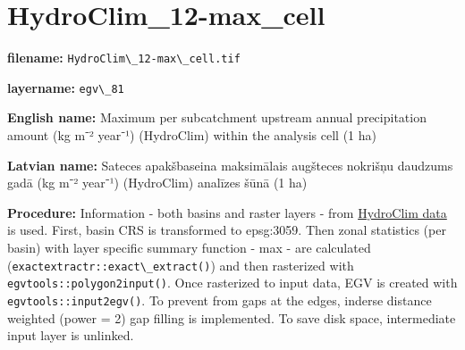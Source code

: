 \documentclass[
]{book}
\newcommand{\passthrough}[1]{#1}
\begin{document}
\section{HydroClim\_12-max\_cell}\label{ch06.081}

\textbf{filename:} \passthrough{\lstinline!HydroClim\_12-max\_cell.tif!}

\textbf{layername:} \passthrough{\lstinline!egv\_81!}

\textbf{English name:} Maximum per subcatchment upstream annual precipitation amount (kg m⁻² year⁻¹) (HydroClim) within the analysis cell (1 ha)

\textbf{Latvian name:} Sateces apakšbaseina maksimālais augšteces nokrišņu daudzums gadā (kg m⁻² year⁻¹) (HydroClim) analīzes šūnā (1 ha)

\textbf{Procedure:} Information - both basins and raster layers - from \hyperref[Ch04.12]{HydroClim data}
is used. First, basin CRS is transformed to epsg:3059. Then zonal statistics (per basin) with
layer specific summary function - max - are calculated (\passthrough{\lstinline!exactextractr::exact\_extract()!})
and then rasterized with \passthrough{\lstinline!egvtools::polygon2input()!}. Once rasterized to input data,
EGV is created with \passthrough{\lstinline!egvtools::input2egv()!}. To prevent from gaps at the edges,
inderse distance weighted (power = 2) gap filling is implemented. To save disk space,
intermediate input layer is unlinked.
\end{document}
